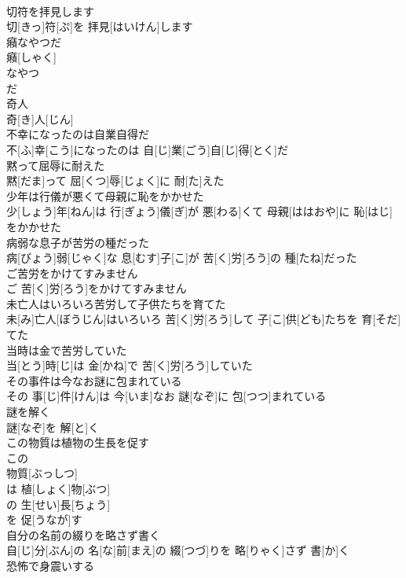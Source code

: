 \documentclass[8pt]{extreport}
\begin{document}
\begin{CJK}{UTF8}{min}
\\	切符を拝見します	
\\	切[きっ]符[ぷ]を 拝見[はいけん]します
\\	癪なやつだ	
\\	癪[しゃく]
\\	なやつ 
\\	だ
\\	奇人	
\\	奇[き]人[じん]
\\	不幸になったのは自業自得だ	
\\	不[ふ]幸[こう]になったのは 自[じ]業[ごう]自[じ]得[とく]だ
\\	黙って屈辱に耐えた	
\\	黙[だま]って 屈[くつ]辱[じょく]に 耐[た]えた
\\	少年は行儀が悪くて母親に恥をかかせた	
\\	少[しょう]年[ねん]は 行[ぎょう]儀[ぎ]が 悪[わる]くて 母親[ははおや]に 恥[はじ]をかかせた
\\	病弱な息子が苦労の種だった	
\\	病[びょう]弱[じゃく]な 息[むす]子[こ]が 苦[く]労[ろう]の 種[たね]だった
\\	ご苦労をかけてすみません	
\\	ご 苦[く]労[ろう]をかけてすみません
\\	未亡人はいろいろ苦労して子供たちを育てた	
\\	未[み]亡人[ぼうじん]はいろいろ 苦[く]労[ろう]して 子[こ]供[ども]たちを 育[そだ]てた
\\	当時は金で苦労していた	
\\	当[とう]時[じ]は 金[かね]で 苦[く]労[ろう]していた
\\	その事件は今なお謎に包まれている	
\\	その 事[じ]件[けん]は 今[いま]なお 謎[なぞ]に 包[つつ]まれている
\\	謎を解く	
\\	謎[なぞ]を 解[と]く
\\	この物質は植物の生長を促す	
\\	この 
\\	物質[ぶっしつ]
\\	は 植[しょく]物[ぶつ]
\\	の 生[せい]長[ちょう]
\\	を 促[うなが]す 
\\	自分の名前の綴りを略さず書く	
\\	自[じ]分[ぶん]の 名[な]前[まえ]の 綴[つづ]りを 略[りゃく]さず 書[か]く
\\	恐怖で身震いする	

\end{CJK}
\end{document}
